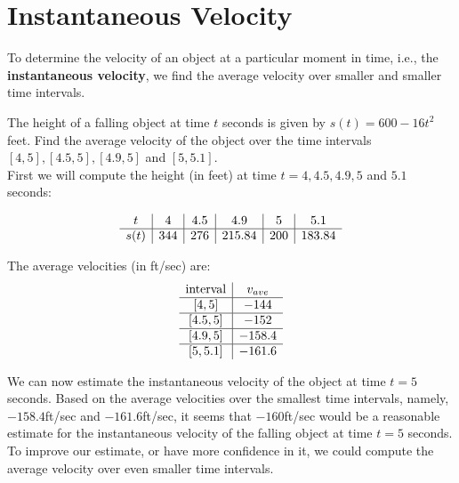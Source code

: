 \documentclass[handout]{ximera}
\begin{document}
\section{Instantaneous Velocity}
To determine the velocity of an object at a particular moment in time, i.e., 
the \textbf{instantaneous velocity}, we find the average velocity 
over smaller and smaller time intervals.

\begin{example}[example 3]
The height of a falling object at time $t$ seconds is given by $s(t) = 600-16t^2$ feet.
Find the average velocity of the object over the time 
intervals $[4, 5], [4.5, 5], [4.9, 5]$ and $[5, 5.1]$.\\
First we will compute the height (in feet) at time $t = 4, 4.5, 4.9, 5$ and $5.1$ seconds:
  
\[
\begin{array}{ c | c | c | c | c | c }
   t& 4 & 4.5 & 4.9 & 5 & 5.1 \\ 
	\hline
	s(t) & 344 & 276 & 215.84 & 200 & 183.84
\end{array}
\]

The average velocities (in ft/sec) are:
\[
\begin{array}{ c | c  }
   \text{interval}& v_{ave} \\ 
	\hline
	[4,5] & -144 \\
	\hline
	[4.5,5] & -152 \\
	\hline
	[4.9,5] & -158.4 \\
	\hline
	[5, 5.1] & -161.6
\end{array}
\]

We can now estimate the instantaneous velocity of the object at time $t = 5$ seconds.  Based on the 
average velocities over the smallest time intervals, namely, $-158.4$ft/sec 
and $-161.6$ft/sec, it seems that $-160$ft/sec would be a reasonable estimate 
for the instantaneous velocity of the falling object at time $t = 5$ seconds.
To improve our estimate, or have more confidence in it, we could compute the average velocity over 
even smaller time intervals.

\end{example}
\end{document}
